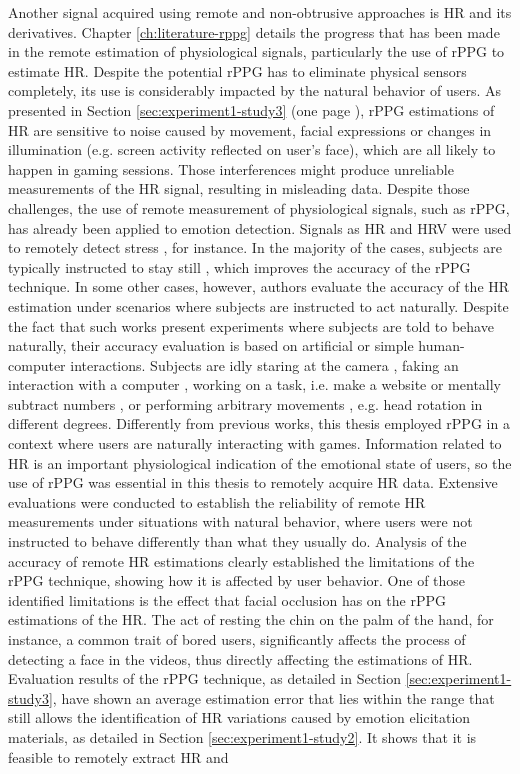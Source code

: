 Another signal acquired using remote and non-obtrusive approaches is HR and its derivatives. Chapter \ref{ch:literature-rppg} details the progress that has been made in the remote estimation of physiological signals, particularly the use of rPPG to estimate HR. Despite the potential rPPG has to eliminate physical sensors completely, its use is considerably impacted by the natural behavior of users. As presented in Section \ref{sec:experiment1-study3} (one page \pageref{sec:experiment1-study3}), rPPG estimations of HR are sensitive to noise caused by movement, facial expressions or changes in illumination (e.g. screen activity reflected on user's face), which are all likely to happen in gaming sessions. Those interferences might produce unreliable measurements of the HR signal, resulting in misleading data. Despite those challenges, the use of remote measurement of physiological signals, such as rPPG, has already been applied to emotion detection. Signals as HR and HRV were used to remotely detect stress \parencite{mcduffcogcam, mcduff2014improvements, bousefsaf2013remote}, for instance. In the majority of the cases, subjects are typically instructed to stay still \parencite{rouast2016remote}, which improves the accuracy of the rPPG technique. In some other cases, however, authors evaluate the accuracy of the HR estimation under scenarios where subjects are instructed to act naturally. Despite the fact that such works present experiments where subjects are told to behave naturally, their accuracy evaluation is based on artificial or simple human-computer interactions. Subjects are idly staring at the camera \parencite{zhao2013remote,hsu2014learning}, faking an interaction with a computer \parencite{poh2010non}, working on a task, i.e. make a website \parencite{monkaresi2014machine} or mentally subtract numbers \parencite{mcduff2014remote}, or performing arbitrary movements \parencite{tran2015robust}, e.g. head rotation in different degrees. Differently from previous works, this thesis employed rPPG in a context where users are naturally interacting with games. Information related to HR is an important physiological indication of the emotional state of users, so the use of rPPG was essential in this thesis to remotely acquire HR data. Extensive evaluations were conducted to establish the reliability of remote HR measurements under situations with natural behavior, where users were not instructed to behave differently than what they usually do. Analysis of the accuracy of remote HR estimations clearly established the limitations of the rPPG technique, showing how it is affected by user behavior. One of those identified limitations is the effect that facial occlusion has on the rPPG estimations of the HR. The act of resting the chin on the palm of the hand, for instance, a common trait of bored users, significantly affects the process of detecting a face in the videos, thus directly affecting the estimations of HR. Evaluation results of the rPPG technique, as detailed in Section \ref{sec:experiment1-study3}, have shown an average estimation error that lies within the range that still allows the identification of HR variations caused by emotion elicitation materials, as detailed in Section \ref{sec:experiment1-study2}. It shows that it is feasible to remotely extract HR and 